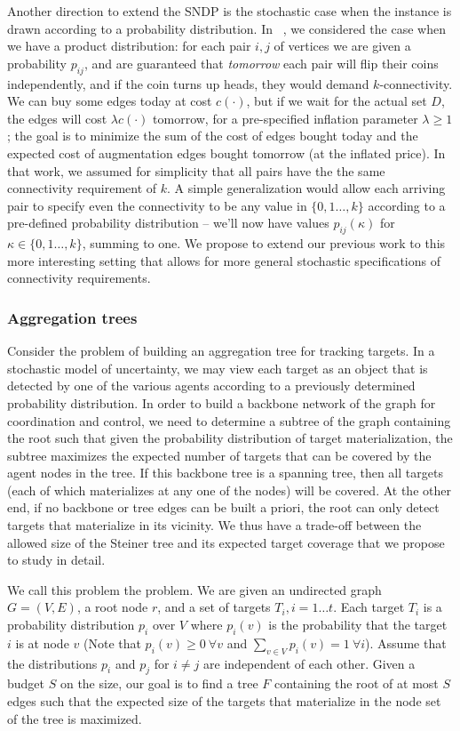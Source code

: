Another direction to extend the SNDP is the
stochastic case when the instance is drawn according to a probability
distribution. In ~\cite{gkr10}, we considered the case when we have a product
distribution: for each pair $i,j$ of vertices we are given a probability $p_{ij}$,
and are guaranteed that \emph{tomorrow} each pair will flip their coins
independently, and if the coin turns up heads, they would demand
$k$-connectivity. We can buy some edges today at cost $c(\cdot)$, but if
we wait for the actual set $D$, the edges will cost $\lambda c(\cdot)$
tomorrow, for a pre-specified inflation parameter $\lambda \geq 1$; the goal
is to minimize the sum of the cost of edges bought today and the
expected cost of augmentation edges bought tomorrow (at the inflated price).
In that work, we assumed for simplicity that all pairs have the the same
connectivity requirement of $k$. A simple generalization would allow each arriving pair to specify even the connectivity to be any value in $\{0,1\ldots,k\}$ according to a pre-defined probability distribution -- we'll now have values $p_{ij}(\kappa)$ for $\kappa \in \{0,1\ldots,k\}$, summing to one. We propose to extend our previous work to this more interesting setting that allows for more general stochastic specifications of connectivity requirements.

\subsubsection{Aggregation trees}
\label{sec:aggregation}
Consider the problem of building an aggregation tree for tracking
targets.  In a stochastic model of uncertainty, we may view each
target as an object that is detected by one of the various agents
according to a previously determined probability distribution.  In
order to build a backbone network of the graph for coordination and
control, we need to determine a subtree of the graph containing the
root such that given the probability distribution of target
materialization, the subtree maximizes the expected number of targets
that can be covered by the agent nodes in the tree. If this backbone
tree is a spanning tree, then all targets (each of which materializes
at any one of the nodes) will be covered. At the other end, if no
backbone or tree edges can be built a priori, the root can only detect
targets that materialize in its vicinity. We thus have a trade-off
between the allowed size of the Steiner tree and its expected target
coverage that we propose to study in detail.

We call this problem the  problem.  We are given an undirected graph $G =
(V,E)$, a root node $r$, and a set of targets $T_i, i = 1 \ldots
t$. Each target $T_i$ is a probability distribution $p_i$ over $V$
where $p_i(v)$ is the probability that the target $i$ is at node $v$
(Note that $p_i(v) \geq 0 \ \forall v$ and $\sum_{v \in V} p_i(v) = 1
\ \forall i$). Assume that the distributions $p_i$ and $p_j$ for $i
\neq j$ are independent of each other. Given a budget $S$ on the size, our
goal is to find a tree $F$ containing the root of at most $S$ edges
such that the expected size of the targets that materialize in the
node set of the tree is maximized.

